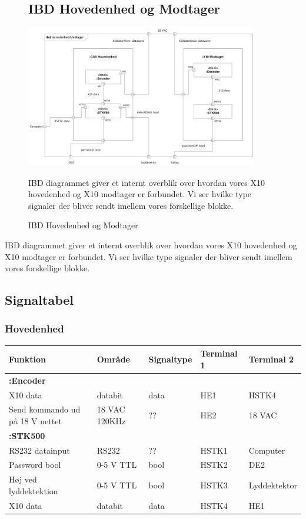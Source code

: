 \begin{figure}[!htbp] \centering
\subsection{IBD Hovedenhed og Modtager}
{\includegraphics[width=0.9\textwidth]{billeder/diagrammer/IBD_Hovedenhed_Modtager}}
\caption{IBD Hovedenhed og Modtager}
\label{lab:ibdhovedenhedmodtager}
\raggedright
IBD diagrammet giver et internt overblik over hvordan vores X10 hovedenhed og X10 modtager er forbundet. Vi ser hvilke type signaler der bliver sendt imellem vores forskellige blokke.
\end{figure}
IBD diagrammet giver et internt overblik over hvordan vores X10 hovedenhed og X10 modtager er forbundet. Vi ser hvilke type signaler der bliver sendt imellem vores forskellige blokke.

\subsection{Signaltabel}

\subsubsection{Hovedenhed}
\begin{tabular}{|p{3cm}|p{}|p{}|p{}|p{}|}
\hline 
\textbf{Funktion} &\textbf{Område} &\textbf{Signaltype} &\textbf{Terminal 1} &\textbf{Terminal 2} \\ 
\hline 
\multicolumn{5}{|l|}{\textbf{:Encoder}} \\ 
\hline 
X10 data &databit &data &HE1 &HSTK4\\ 
\hline 
Send kommando ud på 18 V nettet &18 VAC \newline 120KHz &?? &HE2 &18 VAC\\ 
\hline 
\multicolumn{5}{|l|}{\textbf{:STK500}} \\ 
\hline 
RS232 datainput &RS232 &?? &HSTK1 &Computer\\ 
\hline 
Password bool  &0-5 V TTL &bool &HSTK2 &DE2\\ 
\hline 
Høj ved lyddektektion &0-5 V TTL &bool &HSTK3 &Lyddektektor\\ 
\hline 
X10 data &databit &data &HSTK4 &HE1\\ 
\hline 
\end{tabular} 

